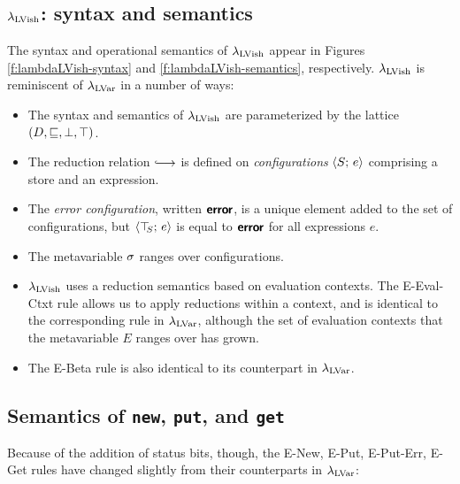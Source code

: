 \subsection{$\lambda_{\textrm{LVish}}$: syntax and semantics}

\FigLambdaLVishGrammar

\FigLambdaLVishSemantics

The syntax and operational semantics of $\lambda_{\textrm{LVish}}$ appear in
Figures \ref{f:lambdaLVish-syntax} and \ref{f:lambdaLVish-semantics},
respectively.  $\lambda_{\textrm{LVish}}$ is reminiscent of $\lambda_{\textrm{LVar}}$ in a
number of ways:
\begin{itemize}
\item The syntax and semantics of $\lambda_{\textrm{LVish}}$ are parameterized by
  the lattice $(D, \sqsubseteq, \bot, \top)$.

\item The reduction relation $\parstepsto$ is defined on
  \emph{configurations} $\langle S;\, e \rangle$ comprising a store and an
  expression.

\item The \emph{error configuration}, written $\textbf{\textsf{error}}$, is a unique
  element added to the set of configurations, but $\langle \top\hspace{-0.85mm}_{S};\, e \rangle$
  is equal to $\textbf{\textsf{error}}$ for all expressions $e$.

\item The metavariable $\sigma$ ranges over configurations.

\item $\lambda_{\textrm{LVish}}$ uses a reduction semantics based on evaluation
  contexts.  The {\sc E-Eval-Ctxt} rule allows us to apply reductions
  within a context, and is identical to the corresponding rule in
  $\lambda_{\textrm{LVar}}$, although the set of evaluation contexts that the
  metavariable $E$ ranges over has grown.

\item The {\sc E-Beta} rule is also identical to its counterpart in
  $\lambda_{\textrm{LVar}}$.
\end{itemize}

\subsection{Semantics of \lstinline|new|, \lstinline|put|, and \lstinline|get|}\label{subsection:newputget}

Because of the addition of status bits, though, the {\sc E-New}, {\sc
  E-Put}, {\sc E-Put-Err}, {\sc E-Get} rules have changed slightly
from their counterparts in $\lambda_{\textrm{LVar}}$:

